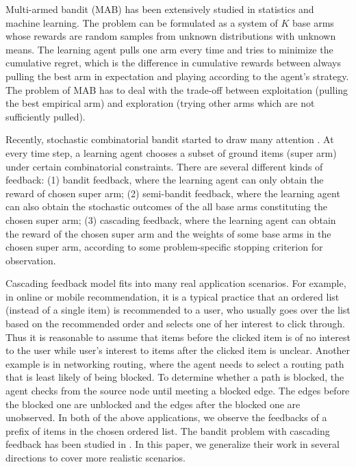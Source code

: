 \documentclass{article}
\begin{document}
Multi-armed bandit (MAB) has been extensively studied in statistics and machine learning. 
The problem can be formulated as a system of $K$ base arms whose rewards are random samples from unknown distributions with unknown means.
 The learning agent pulls one arm every time and tries to minimize the cumulative regret, 
which is the difference in cumulative rewards between always pulling the best arm in expectation and
 playing according to the agent's strategy.
The problem of MAB has to deal with the trade-off between exploitation (pulling the best empirical arm) and exploration (trying other arms which are not sufficiently pulled).

Recently, stochastic combinatorial bandit started to draw many attention \cite{gai2012combinatorial,chen2013combinatorial,lin2014combinatorial,GMM14,chen2014pure,KWAEE14,kveton2014tight,kveton2015cascading,kveton2015combinatorial,lin2015online,Combes2015}. 
At every time step, a learning agent chooses a subset of ground items (super arm) under certain combinatorial constraints. There are several different kinds of feedback: (1) bandit feedback, where the learning agent can only obtain the reward of chosen super arm; (2) semi-bandit feedback, where the learning agent can also obtain the stochastic outcomes of the all base arms constituting the chosen super arm; 
(3) cascading feedback, where the learning agent can obtain the reward of the chosen super arm and the weights of some base arms in the chosen super arm, according to some problem-specific stopping criterion for observation.

Cascading feedback model fits into many real application scenarios.
For example, in online or mobile recommendation, it is a typical practice that an ordered list
	(instead of a single item) is recommended to a user, who
	usually goes over the list based on the recommended order and selects one of her interest to
	click through.
Thus it is reasonable to assume that items before the clicked item is of no interest to the user
	while user's interest to items after the clicked item is unclear.
Another example is in networking routing, where the agent needs to select a routing path that is least
	likely of being blocked.
To determine whether a path is blocked, the agent checks from the source node until meeting a blocked edge. 
The edges before the blocked one are unblocked and the edges after the blocked one are unobserved.
In both of the above applications, we observe the feedbacks of a prefix of items in the chosen ordered list. The bandit problem with cascading feedback has been studied in \cite{kveton2015cascading,kveton2015combinatorial}. 
In this paper, we generalize their work in several directions to cover more realistic scenarios.
\end{document}
